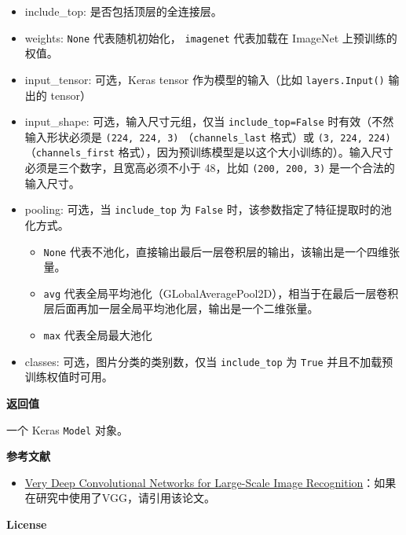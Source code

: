 \begin{itemize}
\tightlist
\item
  include\_top: 是否包括顶层的全连接层。
\item
  weights: \texttt{None} 代表随机初始化，
  \texttt{\textquotesingle{}imagenet\textquotesingle{}} 代表加载在
  ImageNet 上预训练的权值。
\item
  input\_tensor: 可选，Keras tensor 作为模型的输入（比如
  \texttt{layers.Input()} 输出的 tensor）
\item
  input\_shape: 可选，输入尺寸元组，仅当 \texttt{include\_top=False}
  时有效（不然输入形状必须是 \texttt{(224,\ 224,\ 3)}
  （\texttt{channels\_last} 格式）或 \texttt{(3,\ 224,\ 224)}
  （\texttt{channels\_first}
  格式），因为预训练模型是以这个大小训练的）。输入尺寸必须是三个数字，且宽高必须不小于
  48，比如 \texttt{(200,\ 200,\ 3)} 是一个合法的输入尺寸。
\item
  pooling: 可选，当 \texttt{include\_top} 为 \texttt{False}
  时，该参数指定了特征提取时的池化方式。

  \begin{itemize}
  \tightlist
  \item
    \texttt{None}
    代表不池化，直接输出最后一层卷积层的输出，该输出是一个四维张量。
  \item
    \texttt{\textquotesingle{}avg\textquotesingle{}}
    代表全局平均池化（GLobalAveragePool2D），相当于在最后一层卷积层后面再加一层全局平均池化层，输出是一个二维张量。
  \item
    \texttt{\textquotesingle{}max\textquotesingle{}} 代表全局最大池化
  \end{itemize}
\item
  classes: 可选，图片分类的类别数，仅当 \texttt{include\_top} 为
  \texttt{True} 并且不加载预训练权值时可用。
\end{itemize}

\textbf{返回值}\label{ux8fd4ux56deux503c-1}

一个 Keras \texttt{Model} 对象。

\textbf{参考文献}\label{ux53c2ux8003ux6587ux732e-1}

\begin{itemize}
\tightlist
\item
  \href{https://arxiv.org/abs/1409.1556}{Very Deep Convolutional
  Networks for Large-Scale Image
  Recognition}：如果在研究中使用了VGG，请引用该论文。
\end{itemize}

\textbf{License}\label{license-1}

